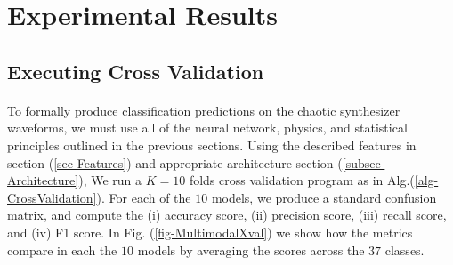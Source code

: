 \documentclass[12pt,letterpaper]{article}
\begin{document}

\newpage
\section{Experimental Results}
\label{sec-Results}

\subsection{Executing Cross Validation}

\paragraph*{}To formally produce classification predictions on the chaotic synthesizer waveforms, we must use all of the neural network, physics, and statistical principles outlined in the previous sections. Using the described features in section (\ref{sec-Features}) and appropriate architecture section (\ref{subsec-Architecture}), We run a $K=10$ folds cross validation program as in Alg.(\ref{alg-CrossValidation}). For each of the $10$ models, we produce a standard confusion matrix, and compute the (i) accuracy score, (ii) precision score, (iii) recall score, and (iv) F1 score. In Fig. (\ref{fig-MultimodalXval}) we show how the metrics compare in each the $10$ models by averaging the scores across the $37$ classes.
\end{document}
